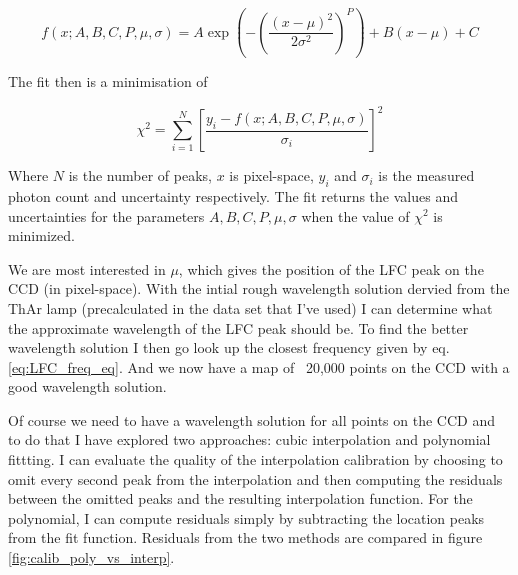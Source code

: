     \begin{equation}
        \label{eq:LFC_super_gauss}
        f(x ; A, B, C, P, \mu, \sigma) = A \exp \left(-\left(\frac{\left(x-\mu\right)^{2}}{2 \sigma^{2}}\right)^{P}\right) + B(x-\mu) + C
    \end{equation}

    The fit then is a minimisation of  

    \begin{equation}
        \label{eq:chi2_super_gauss}
        \chi^{2}=\sum_{i=1}^{N}\left[\frac{y_{i}-f(x ; A, B, C, P, \mu, \sigma)}{\sigma_{i}}\right]^{2}
    \end{equation}

    Where $N$ is the number of peaks, $x$ is pixel-space, $y_i$ and $\sigma_i$ is the measured photon count and uncertainty respectively. The fit returns the values and uncertainties for the parameters $A, B, C, P, \mu, \sigma$ when the value of $\chi^2$ is minimized.

    
    We are most interested in $\mu$, which gives the position of the LFC peak on the CCD (in pixel-space). With the intial rough wavelength solution dervied from the ThAr lamp (precalculated in the data set that I've used) I can determine what the approximate wavelength of the LFC peak should be. To find the better wavelength solution I then go look up the closest frequency given by eq. \ref{eq:LFC_freq_eq}. And we now have a map of ~20,000 points on the CCD with a good wavelength solution. 
    
    Of course we need to have a wavelength solution for all points on the CCD and to do that I have explored two approaches: cubic interpolation and polynomial fittting. I can evaluate the quality of the interpolation calibration by choosing to omit every second peak from the interpolation and then computing the residuals between the omitted peaks and the resulting interpolation function. For the polynomial, I can compute residuals simply by subtracting the location peaks from the fit function. Residuals from the two methods are compared in figure \ref{fig:calib_poly_vs_interp}.

